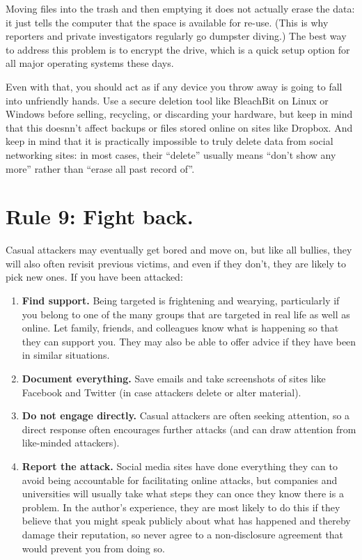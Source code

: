 \documentclass[10pt,letterpaper]{article}
\newcommand{\rulemajor}[1]{\section*{#1}}
\begin{document}
Moving files into the trash and then emptying it does not actually erase the data:
it just tells the computer that the space is available for re-use.
(This is why reporters and private investigators regularly go dumpster diving.)
The best way to address this problem is to encrypt the drive,
which is a quick setup option for all major operating systems these days.

Even with that,
you should act as if any device you throw away is going to fall into unfriendly hands.
Use a secure deletion tool like BleachBit on Linux or Windows
before selling, recycling, or discarding your hardware,
but keep in mind that this doesnn't affect backups or files stored online
on sites like Dropbox.
And keep in mind that it is practically impossible to truly delete data from social networking sites:
in most cases,
their ``delete'' usually means ``don't show any more''
rather than ``erase all past record of''.

\rulemajor{Rule 9: Fight back.}

Casual attackers may eventually get bored and move on,
but like all bullies,
they will also often revisit previous victims,
and even if they don't,
they are likely to pick new ones.
If you have been attacked:

\begin{enumerate}

\item
  \textbf{Find support.}
  Being targeted is frightening and wearying,
  particularly if you belong to one of the many groups that are targeted in real life
  as well as online.
  Let family, friends, and colleagues know what is happening so that they can support you.
  They may also be able to offer advice if they have been in similar situations.
  
\item
  \textbf{Document everything.}
  Save emails
  and take screenshots of sites like Facebook and Twitter
  (in case attackers delete or alter material).

\item
  \textbf{Do not engage directly.}
  Casual attackers are often seeking attention,
  so a direct response often encourages further attacks
  (and can draw attention from like-minded attackers).
  
\item
  \textbf{Report the attack.}
  Social media sites have done everything they can
  to avoid being accountable for facilitating online attacks,
  but companies and universities will usually take what steps they can
  once they know there is a problem.
  In the author's experience,
  they are most likely to do this if they believe that
  you might speak publicly about what has happened
  and thereby damage their reputation,
  so never agree to a non-disclosure agreement that would prevent you from doing so.
  
\end{enumerate}
\end{document}
